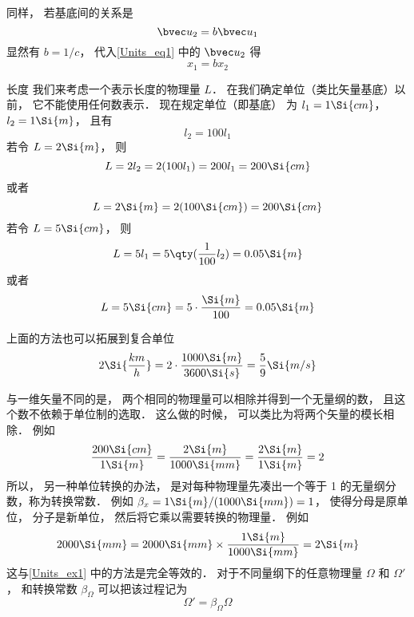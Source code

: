 同样， 若基底间的关系是
\begin{equation}
\bvec u_2 = b\bvec u_1
\end{equation}
显然有 $b = 1/c$， 代入\autoref{Units_eq1} 中的 $\bvec u_2$ 得
\begin{equation}
x_1 = b x_2
\end{equation}

\begin{example}{长度}\label{Units_ex1}
我们来考虑一个表示长度的物理量 $L$． 在我们确定单位（类比矢量基底）以前， 它不能使用任何数表示． 现在规定单位（即基底） 为 $l_1 = 1\Si{cm}$， $l_2 = 1\Si{m}$， 且有
\begin{equation}
l_2 = 100 l_1
\end{equation}
若令 $L = 2\Si{m}$， 则
\begin{equation}
L = 2 l_2 = 2 (100 l_1) = 200 l_1 = 200 \Si{cm}
\end{equation}
或者
\begin{equation}
L = 2 \Si{m} = 2 (100 \Si{cm}) = 200 \Si{cm}
\end{equation}
若令 $L = 5\Si{cm}$， 则
\begin{equation}
L = 5 l_1 = 5 \qty(\frac{1}{100} l_2) = 0.05 \Si{m}
\end{equation}
或者
\begin{equation}
L = 5 \Si{cm} = 5 \cdot \frac{\Si{m}}{100} = 0.05 \Si{m}
\end{equation}
\end{example}

\begin{example}{}
上面的方法也可以拓展到复合单位
\begin{equation}
2 \Si{\frac{km}{h}} = 2\cdot \frac{1000 \Si{m}}{3600 \Si{s}} = \frac{5}{9}\Si{m/s}
\end{equation}
\end{example}

与一维矢量不同的是， 两个相同的物理量可以相除并得到一个无量纲的数， 且这个数不依赖于单位制的选取． 这么做的时候， 可以类比为将两个矢量的模长相除． 例如
\begin{equation}
\frac{200\Si{cm}}{1\Si{m}} = \frac{2\Si{m}}{1000\Si{mm}} = \frac{2\Si{m}}{1\Si{m}} = 2
\end{equation}
所以， 另一种单位转换的办法， 是对每种物理量先凑出一个等于 1 的无量纲分数，称为转换常数． 例如 $\beta_x = 1\Si{m}/(1000\Si{mm}) = 1$， 使得分母是原单位， 分子是新单位， 然后将它乘以需要转换的物理量． 例如
\begin{equation}
2000\Si{mm} = 2000\Si{mm} \times \frac{1\Si{m}}{1000\Si{mm}} = 2\Si{m}
\end{equation}
这与\autoref{Units_ex1} 中的方法是完全等效的． 对于不同量纲下的任意物理量 $\Omega$ 和 $\Omega'$， 和转换常数 $\beta_\Omega$ 可以把该过程记为
\begin{equation}
\Omega' = \beta_\Omega \Omega
\end{equation}


